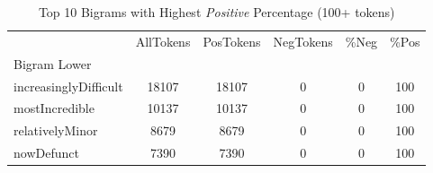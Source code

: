 

\singlespacing
\scriptsize\noindent
\begin{table}
\centering
\caption{Top 10 Bigrams with Highest \textit{Positive} Percentage (100+ tokens)}
\label{tab:top10PosPercent}
\begin{tabular}{*{1}{l}S[table-auto-round, table-format=7.2, drop-zero-decimal]
    S[table-auto-round, table-format=7.2, drop-zero-decimal]
    S[table-auto-round, table-format=7.2, drop-zero-decimal]
    S[table-auto-round, table-format=7.2, drop-zero-decimal]
    S[table-auto-round, table-format=7.2, drop-zero-decimal]}
\toprule
{} & {AllTokens} & {PosTokens} & {NegTokens} & {\%Neg} & {\%Pos} \\
{Bigram Lower} & {} & {} & {} & {} & {} \\
\midrule
increasinglyDifficult & {} \color[HTML]{F1F1F1} 18107 & {} \color[HTML]{F1F1F1} 18107 & {} \color[HTML]{000000} 0 & {} \color[HTML]{000000} 0 & {} \color[HTML]{000000} 100 \\
mostIncredible & {} \color[HTML]{000000} 10137 & {} \color[HTML]{000000} 10137 & {} \color[HTML]{000000} 0 & {} \color[HTML]{000000} 0 & {} \color[HTML]{000000} 100 \\
relativelyMinor & {} \color[HTML]{000000} 8679 & {} \color[HTML]{000000} 8679 & {} \color[HTML]{000000} 0 & {} \color[HTML]{000000} 0 & {} \color[HTML]{000000} 100 \\
nowDefunct & {} \color[HTML]{000000} 7390 & {} \color[HTML]{000000} 7390 & {} \color[HTML]{000000} 0 & {} \color[HTML]{000000} 0 & {} \color[HTML]{000000} 100 \\

\end{tabular}
\end{table}
